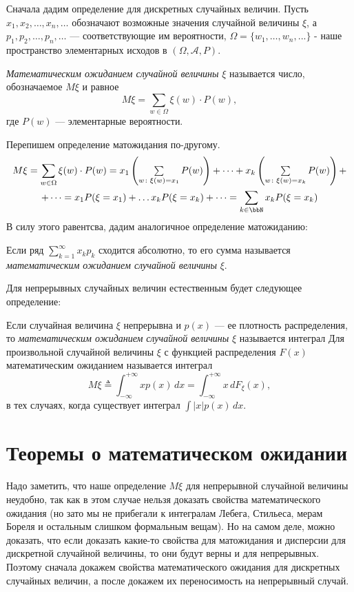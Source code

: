 Сначала дадим определение для дискретных случайных величин. Пусть $x_1,x_2,\dots,x_n,\dots$ обозначают возможные значения случайной величины $\xi$, а $p_1,p_2,\dots,p_n,\dots$ --- соответствующие им вероятности, $\Omega = \{w_1,\dots, w_n,...\}$ - наше пространство элементарных исходов в $(\Omega,\mathcal A, P)$.
\begin{defn}\label{teorver1}
\textit{Математическим ожиданием случайной величины} $\xi$ называется число, обозначаемое $M\xi$ и равное
\begin{equation}
M\xi = \sum_{w \in \Omega} \xi(w)\cdot P(w),
\end{equation}
где $P(w)$ --- элементарные вероятности.
\end{defn}
Перепишем определение матожидания по-другому.
\begin{multline*}
M\xi=\sum_{w \in \Omega} \xi(w)\cdot P(w)=x_1\left(\textstyle\sum\limits_{w\colon \xi(w)=x_1} P(w)\right)+\dots+x_k\left(\textstyle\sum\limits_{w\colon \xi(w)=x_k} P(w)\right)+\\+\dots =x_1P(\xi=x_1)+\dots x_kP(\xi=x_k)+\dots=\sum_{k\in \bbN} x_kP(\xi=x_k)
\end{multline*}
В силу этого равентсва, дадим аналогичное определение матожиданию:
\begin{defnn}\label{teorver1s}
Если ряд $\sum\limits_{k=1}^{\infty}x_k p_k$ сходится абсолютно, то его сумма называется \textit{математическим ожиданием случайной величины} $\xi$.
\end{defnn}


Для непрерывных случайных величин естественным будет следующее определение: 
\begin{defn} 
Если случайная величина $\xi$ непрерывна и $p(x)$ --- ее плотность распределения, то \textit{математическим ожиданием} \textit{случайной величины} $\xi$ называется интеграл Для произвольной случайной величины $\xi$ с функцией распределения $F(x)$ математическим ожиданием называется интеграл
\begin{equation}
M\xi\triangleq\int_{-\infty}^{+\infty} xp(x)\,dx = \int_{-\infty}^{+\infty} x\,dF_\xi(x),
\end{equation}
в тех случаях, когда существует интеграл $\int |x|p(x)\,dx.$ 
\end{defn}



\section{Теоремы о математическом ожидании}
Надо заметить, что наше определение $M\xi$ для непрерывной случайной величины неудобно, так как в этом случае нельзя доказать свойства математического ожидания (но зато мы не прибегали к интегралам Лебега, Стильеса, мерам Бореля и остальным слишком формальным вещам). Но на самом деле, можно доказать, что если доказать какие-то свойства для матожидания и дисперсии для дискретной случайной величины, то они будут верны и для непрерывных. Поэтому сначала докажем свойства математического ожидания для дискретных случайных величин, а после докажем их переносимость на непрерывный случай.

